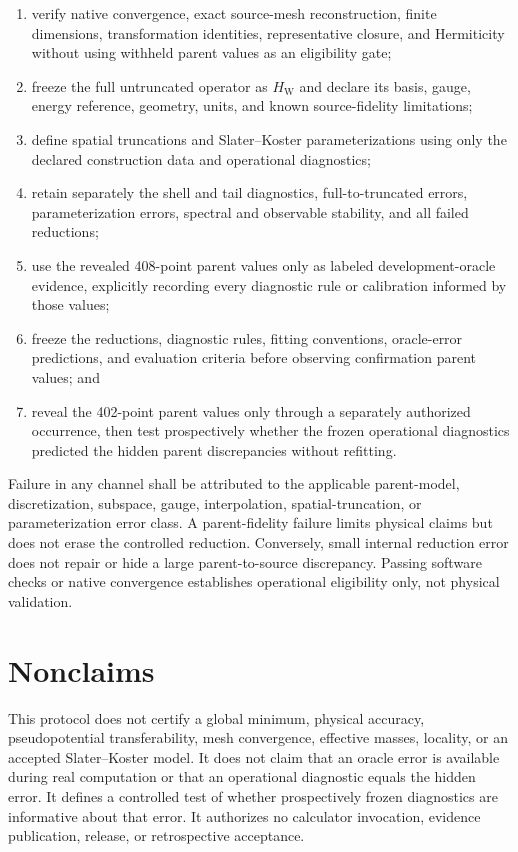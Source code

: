 \documentclass[11pt]{article}
\begin{document}
\begin{enumerate}
  \item verify native convergence, exact source-mesh reconstruction, finite dimensions,
    transformation identities, representative closure, and Hermiticity without using
    withheld parent values as an eligibility gate;
  \item freeze the full untruncated operator as $H_{\mathrm{W}}$ and declare its basis,
    gauge, energy reference, geometry, units, and known source-fidelity limitations;
  \item define spatial truncations and Slater--Koster parameterizations using only the
    declared construction data and operational diagnostics;
  \item retain separately the shell and tail diagnostics, full-to-truncated errors,
    parameterization errors, spectral and observable stability, and all failed
    reductions;
  \item use the revealed 408-point parent values only as labeled development-oracle
    evidence, explicitly recording every diagnostic rule or calibration informed by
    those values;
  \item freeze the reductions, diagnostic rules, fitting conventions, oracle-error
    predictions, and evaluation criteria before observing confirmation parent values;
    and
  \item reveal the 402-point parent values only through a separately authorized
    occurrence, then test prospectively whether the frozen operational diagnostics
    predicted the hidden parent discrepancies without refitting.
\end{enumerate}

Failure in any channel shall be attributed to the applicable parent-model,
discretization, subspace, gauge, interpolation, spatial-truncation, or parameterization
error class.  A parent-fidelity failure limits physical claims but does not erase the
controlled reduction.  Conversely, small internal reduction error does not repair or
hide a large parent-to-source discrepancy.  Passing software checks or native
convergence establishes operational eligibility only, not physical validation.

\section{Nonclaims}

This protocol does not certify a global minimum, physical accuracy, pseudopotential
transferability, mesh convergence, effective masses, locality, or an accepted
Slater--Koster model.  It does not claim that an oracle error is available during real
computation or that an operational diagnostic equals the hidden error.  It defines a
controlled test of whether prospectively frozen diagnostics are informative about that
error.  It authorizes no calculator invocation, evidence publication, release, or
retrospective acceptance.
\end{document}
